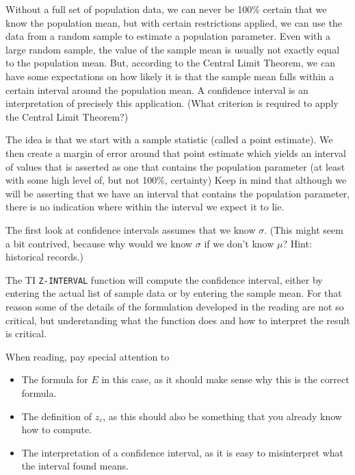 \documentclass{ccg-topic}
\begin{document}
    Without a full set of population data, we can never be 100\% certain that we know the population mean, but with certain restrictions applied, we can use the data from a random sample to estimate a population parameter. Even with a large random sample, the value of the sample mean is usually not exactly equal to the population mean. But, according to the Central Limit Theorem, we can have some expectations on how likely it is that the sample mean falls within a certain interval around the population mean. A confidence interval is an interpretation of precisely this application. (What criterion is required to apply the Central Limit Theorem?)

    The idea is that we start with a sample statistic (called a point estimate). We then create a margin of error around that point estimate which yields an interval of values that is asserted as one that contains the population parameter (at least with some high level of, but not 100\%, certainty) Keep in mind that although we will be asserting that we have an interval that contains the population parameter, there is no indication where within the interval we expect it to lie.
    
    The first look at confidence intervals assumes that we know $\sigma$.  (This might seem a bit contrived, because why would we know $\sigma$ if we don’t know $\mu$? Hint: historical records.)
    
    The TI \texttt{Z-INTERVAL} function will compute the confidence interval, either by entering the actual list of sample data or by entering the sample mean. For that reason some of the details of the formulation developed in the reading are not so critical, but understanding what the function does and how to interpret the result is critical.
    
    When reading, pay special attention to
    
        \begin{itemize}
        
            \item The formula for $E$ in this case, as it should make sense why this is the correct formula.
            
            \item The definition of $z_c$, as this should also be something that you already know how to compute.
            
            \item The interpretation of a confidence interval, as it is easy to misinterpret what the interval found means.
            
        \end{itemize}
        
\end{document}
